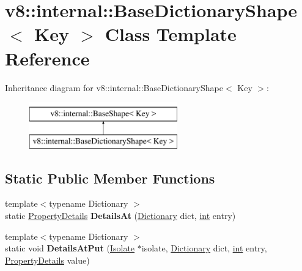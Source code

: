 \hypertarget{classv8_1_1internal_1_1BaseDictionaryShape}{}\section{v8\+:\+:internal\+:\+:Base\+Dictionary\+Shape$<$ Key $>$ Class Template Reference}
\label{classv8_1_1internal_1_1BaseDictionaryShape}
Inheritance diagram for v8\+:\+:internal\+:\+:Base\+Dictionary\+Shape$<$ Key $>$\+:\begin{figure}[H]
\begin{center}
\leavevmode
\includegraphics[height=2.000000cm]{classv8_1_1internal_1_1BaseDictionaryShape}
\end{center}
\end{figure}
\subsection*{Static Public Member Functions}
\begin{DoxyCompactItemize}
\item 
\mbox{\label{classv8_1_1internal_1_1BaseDictionaryShape_ab04ac495f8ff3e70033268264ea2fa37}} 
{\footnotesize template$<$typename Dictionary $>$ }\\static \mbox{\hyperlink{classv8_1_1internal_1_1PropertyDetails}{Property\+Details}} {\bfseries Details\+At} (\mbox{\hyperlink{classv8_1_1internal_1_1Dictionary}{Dictionary}} dict, \mbox{\hyperlink{classint}{int}} entry)
\item 
\mbox{\label{classv8_1_1internal_1_1BaseDictionaryShape_aaa2dd25a6db416b5a758deb4d19ba313}} 
{\footnotesize template$<$typename Dictionary $>$ }\\static void {\bfseries Details\+At\+Put} (\mbox{\hyperlink{classv8_1_1internal_1_1Isolate}{Isolate}} $\ast$isolate, \mbox{\hyperlink{classv8_1_1internal_1_1Dictionary}{Dictionary}} dict, \mbox{\hyperlink{classint}{int}} entry, \mbox{\hyperlink{classv8_1_1internal_1_1PropertyDetails}{Property\+Details}} value)
\end{DoxyCompactItemize}
